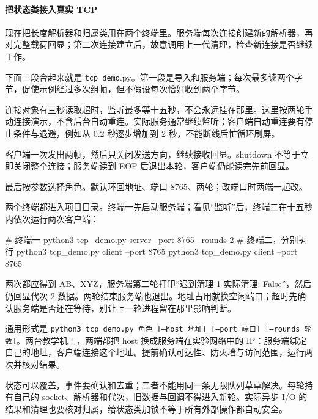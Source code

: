 \paragraph*{把状态类接入真实 TCP}
现在把长度解析器和归属类用在两个终端里。服务端每次连接创建新的解析器，再对完整载荷回显；第二次连接建立后，故意调用上一代清理，检查新连接是否继续工作。
\begin{example}
下面三段合起来就是 \texttt{tcp\_demo}.py。第一段是导入和服务端；每次最多读两个字节，促使示例经过多次组帧，但不假设每次恰好收到两个字节。
\begin{commcode}

\end{commcode}
连接对象有三秒读取超时，监听最多等十五秒，不会永远挂在那里。这里按两轮手动连接演示，不含后台自动重连。实际服务通常继续监听；客户端自动重连要有停止条件与退避，例如从 0.2 秒逐步增加到 2 秒，不能断线后忙循环刷屏。

客户端一次发出两帧，然后只关闭发送方向，继续接收回显。shutdown 不等于立即关闭整个连接；服务端读到 EOF 后退出本轮，客户端仍能读完先前回显。
\begin{commcode}

\end{commcode}
最后按参数选择角色。默认环回地址、端口 8765、两轮；改端口时两端一起改。
\begin{commcode}

\end{commcode}
两个终端都进入项目目录。终端一先启动服务端；看见“监听”后，终端二在十五秒内依次运行两次客户端：
\begin{commcode}
\begin{tbash}
# 终端一
python3 tcp_demo.py server --port 8765 --rounds 2
# 终端二，分别执行
python3 tcp_demo.py client --port 8765
python3 tcp_demo.py client --port 8765
\end{tbash}
\end{commcode}
两次都应得到 AB、XYZ，服务端第二轮打印“迟到清理 1 实际清理: False”，然后仍回显代次 2 数据。两轮结束服务端也退出。地址占用就换空闲端口；超时先确认服务端是否还在等待，别让上一轮进程留在那里影响判断。

通用形式是 \texttt{python3 tcp\_demo.py 角色 [--host 地址] [--port 端口] [--rounds 轮数]}。两台教学机上，两端都把 host 换成服务端在实验网络中的 IP：服务端绑定自己的地址，客户端连接这个地址。提前确认可达性、防火墙与访问范围，运行两次并核对结果。
\end{example}
\begin{conclusion}
状态可以覆盖，事件要确认和去重；二者不能用同一条无限队列草草解决。每轮持有自己的 socket、解析器和代次，旧数据与回调不得进入新轮。实际异步 I/O 的结果和清理也要核对归属，给状态类加锁不等于所有外部操作都自动安全。
\end{conclusion}

